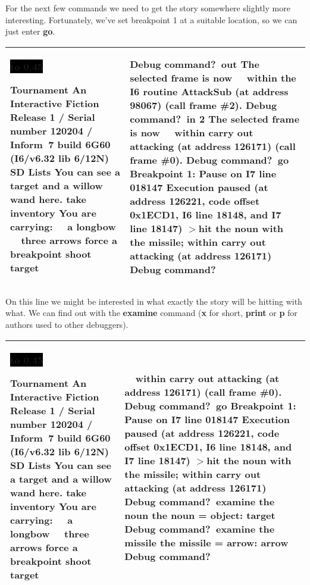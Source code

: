 \documentclass{book}
\newcommand{\n}{\hspace*{\fill}\newline}
\newcommand{\terp}[2]{\begin{center}\begin{tabular}{p{0.45\textwidth}|p{0.45\textwidth}}\midrule #1&#2\\\midrule\end{tabular}\end{center}}
\newcommand{\glkheading}[1]{\textbf{#1}}
\newcommand{\glkinput}[1]{\textbf{#1}}
\newcommand{\glkstatusline}[2]{\centerline{\colorbox{black}{\hbox to 0.45\textwidth{\textcolor{white}{#1\hfil #2}}}}}
\newcommand{\storyprompt}{\raisebox{1.5pt}{\(>\)}}
\newcommand{\cursor}{\raisebox{-1.5pt}{\RectangleThin}}
\newcommand{\markedindent}{\(>\)\qquad}
\begin{document}
For the next few commands we need to get the story somewhere slightly more
interesting.  Fortunately, we've set breakpoint 1 at a suitable location, so we
can just enter \glkinput{go}.

\pagebreak

\terp{\glkstatusline{Lists}{0/2}\n
  \glkheading{Tournament}\n
  An Interactive Fiction\n
  Release 1 / Serial number 120204 / Inform~7 build 6G60 (I6/v6.32 lib 6/12N) SD\n
  \n
  \glkheading{Lists}\n
  You can see a target and a willow wand here.\n
  \n
  \storyprompt\glkinput{take inventory}\n
  You are carrying:\n
  \null\ \ a longbow\n
  \null\ \ three arrows\n
  \n
  \storyprompt\glkinput{force a breakpoint}\n
  \storyprompt\glkinput{shoot target}}{%
  Debug command?\ \glkinput{out}\n
  \n
  The selected frame is now\n
  \null\ \ within the I6 routine AttackSub (at address 98067) (call frame \#2).\n
  \n
  Debug command?\ \glkinput{in 2}\n
  \n
  The selected frame is now\n
  \null\ \ within carry out attacking (at address 126171) (call frame \#0).\n
  \n
  Debug command?\ \glkinput{go}\n
  \n
  \glkheading{Breakpoint 1:} Pause on I7 line 018147\n
  \n
  Execution paused (at address 126221, code offset 0x1ECD1, I6 line 18148, and I7 line 18147)\n
  \markedindent hit the noun with the missile;\n
  within carry out attacking (at address 126171)\n
  \n
  Debug command?\ \cursor}

On this line we might be interested in what exactly the story will be hitting
with what.  We can find out with the \glkinput{examine} command (\glkinput{x}
for short, \glkinput{print} or \glkinput{p} for authors used to other
debuggers).

\terp{\glkstatusline{Lists}{0/2}\n
  \glkheading{Tournament}\n
  An Interactive Fiction\n
  Release 1 / Serial number 120204 / Inform~7 build 6G60 (I6/v6.32 lib 6/12N) SD\n
  \n
  \glkheading{Lists}\n
  You can see a target and a willow wand here.\n
  \n
  \storyprompt\glkinput{take inventory}\n
  You are carrying:\n
  \null\ \ a longbow\n
  \null\ \ three arrows\n
  \n
  \storyprompt\glkinput{force a breakpoint}\n
  \storyprompt\glkinput{shoot target}}{%
  \ \ within carry out attacking (at address 126171) (call frame \#0).\n
  \n
  Debug command?\ \glkinput{go}\n
  \n
  \glkheading{Breakpoint 1:} Pause on I7 line 018147\n
  \n
  Execution paused (at address 126221, code offset 0x1ECD1, I6 line 18148, and I7 line 18147)\n
  \markedindent hit the noun with the missile;\n
  within carry out attacking (at address 126171)\n
  \n
  Debug command?\ \glkinput{examine the noun}\n
  \n
  the noun = object: target\n
  \n
  Debug command?\ \glkinput{examine the missile}\n
  \n
  the missile = arrow: arrow\n
  \n
  Debug command?\ \cursor}
\end{document}
